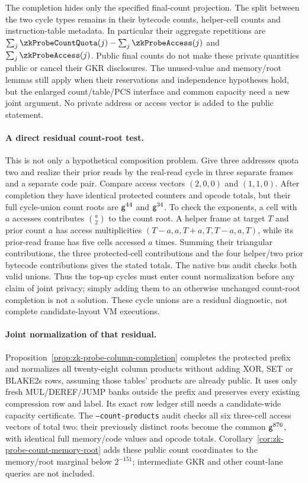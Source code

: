 The completion hides only the specified final-count projection. The split between the two cycle types remains in their bytecode counts, helper-cell counts and instruction-table metadata. In particular their aggregate repetitions are $\sum_j\zkProbeCountQuota(j)-\sum_j\zkProbeAccess(j)$ and $\sum_j\zkProbeAccess(j)$. Public final counts do not make these private quantities public or cancel their GKR disclosures. The unused-value and memory/root lemmas still apply when their reservations and independence hypotheses hold, but the enlarged count/table/PCS interface and common capacity need a new joint argument. No private address or access vector is added to the public statement.

\paragraph{A direct residual count-root test.} This is not only a hypothetical composition problem. Give three addresses quota two and realize their prior reads by the real-read cycle in three separate frames and a separate code pair. Compare access vectors $(2,0,0)$ and $(1,1,0)$. After completion they have identical protected counters and opcode totals, but their full cycle-union count roots are $\mathsf{g}^{44}$ and $\mathsf{g}^{34}$. To check the exponents, a cell with $a$ accesses contributes $\binom a2$ to the count root. A helper frame at target $T$ and prior count $a$ has access multiplicities $(T-a,a,T+a,T,T-a,a,T)$, while its prior-read frame has five cells accessed $a$ times. Summing their triangular contributions, the three protected-cell contributions and the four helper/two prior bytecode contributions gives the stated totals. The native bus audit checks both valid unions. Thus the top-up cycles must enter count normalization before any claim of joint privacy; simply adding them to an otherwise unchanged count-root completion is not a solution. These cycle unions are a residual diagnostic, not complete candidate-layout VM executions.

\paragraph{Joint normalization of that residual.} Proposition~\ref{prop:zk-probe-column-completion} completes the protected prefix and normalizes all twenty-eight column products without adding XOR, SET or BLAKE2s rows, assuming those tables' products are already public. It uses only fresh MUL/DEREF/JUMP banks outside the prefix and preserves every existing compression row and label. Its exact row ledger still needs a candidate-wide capacity certificate. The \texttt{--count-products} audit checks all six three-cell access vectors of total two: their previously distinct roots become the common $\mathsf{g}^{876}$, with identical full memory/code values and opcode totals. Corollary~\ref{cor:zk-probe-count-memory-root} adds these public count coordinates to the memory/root marginal below $2^{-151}$; intermediate GKR and other count-lane queries are not included.

